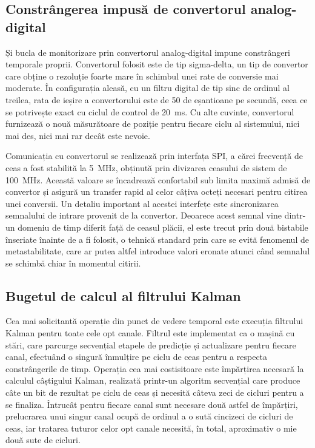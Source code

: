 \subsection{Constrângerea impusă de convertorul analog-digital}

Și bucla de monitorizare prin convertorul analog-digital impune constrângeri
temporale proprii. Convertorul folosit este de tip sigma-delta, un tip de convertor
care obține o rezoluție foarte mare în schimbul unei rate de conversie mai
moderate. În configurația aleasă, cu un filtru digital de tip sinc de ordinul al
treilea, rata de ieșire a convertorului este de 50 de eșantioane pe secundă, ceea
ce se potrivește exact cu ciclul de control de 20~ms. Cu alte cuvinte, convertorul
furnizează o nouă măsurătoare de poziție pentru fiecare ciclu al sistemului, nici
mai des, nici mai rar decât este nevoie.

Comunicația cu convertorul se realizează prin interfața SPI, a cărei frecvență de
ceas a fost stabilită la 5~MHz, obținută prin divizarea ceasului de sistem de
100~MHz. Această valoare se încadrează confortabil sub limita maximă admisă de
convertor și asigură un transfer rapid al celor câțiva octeți necesari pentru
citirea unei conversii. Un detaliu important al acestei interfețe este sincronizarea
semnalului de intrare provenit de la convertor. Deoarece acest semnal vine dintr-un
domeniu de timp diferit față de ceasul plăcii, el este trecut prin două bistabile
înseriate înainte de a fi folosit, o tehnică standard prin care se evită fenomenul
de metastabilitate, care ar putea altfel introduce valori eronate atunci când
semnalul se schimbă chiar în momentul citirii.

\subsection{Bugetul de calcul al filtrului Kalman}

Cea mai solicitantă operație din punct de vedere temporal este execuția filtrului
Kalman pentru toate cele opt canale. Filtrul este implementat ca o mașină cu stări,
care parcurge secvențial etapele de predicție și actualizare pentru fiecare canal,
efectuând o singură înmulțire pe ciclu de ceas pentru a respecta constrângerile de
timp. Operația cea mai costisitoare este împărțirea necesară la calculul câștigului
Kalman, realizată printr-un algoritm secvențial care produce câte un bit de rezultat
pe ciclu de ceas și necesită câteva zeci de cicluri pentru a se finaliza. Întrucât
pentru fiecare canal sunt necesare două astfel de împărțiri, prelucrarea unui singur
canal ocupă de ordinul a o sută cincizeci de cicluri de ceas, iar tratarea tuturor
celor opt canale necesită, în total, aproximativ o mie două sute de cicluri.


